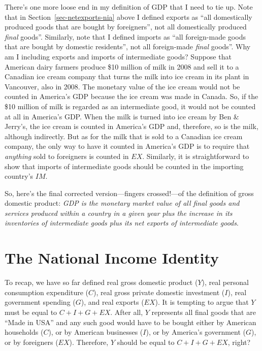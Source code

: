 \documentclass[
  letterpaper,
]{book}
\begin{document}
There's one more loose end in my definition of GDP that I need to tie
up. Note that in Section~\ref{sec-netexports-nia} above I defined
exports as ``all domestically produced goods that are bought by
foreigners'', not all domestically produced \emph{final} goods''.
Similarly, note that I defined imports as ``all foreign-made goods that
are bought by domestic residents'', not all foreign-made \emph{final}
goods''. Why am I including exports and imports of intermediate goods?
Suppose that American dairy farmers produce \$10 million of milk in 2008
and sell it to a Canadian ice cream company that turns the milk into ice
cream in its plant in Vancouver, also in 2008. The monetary value of the
ice cream would not be counted in America's GDP because the ice cream
was made in Canada. So, if the \$10 million of milk is regarded as an
intermediate good, it would not be counted at all in America's GDP. When
the milk is turned into ice cream by Ben \& Jerry's, the ice cream is
counted in America's GDP and, therefore, so is the milk, although
indirectly. But as for the milk that is sold to a Canadian ice cream
company, the only way to have it counted in America's GDP is to require
that \emph{anything} sold to foreigners is counted in \(EX\). Similarly,
it is straightforward to show that imports of intermediate goods should
be counted in the importing country's \(IM\).

So, here's the final corrected version---fingers crossed!---of the
definition of gross domestic product: \emph{GDP is the monetary market
value of all final goods and services produced within a country in a
given year plus the increase in its inventories of intermediate goods
plus its net exports of intermediate goods}.

\section{The National Income Identity}\label{sec-ni-identity}

To recap, we have so far defined real gross domestic product (\(Y\)),
real personal consumption expenditure (\(C\)), real gross private
domestic investment (\(I\)), real government spending (\(G\)), and real
exports (\(EX\)). It is tempting to argue that \(Y\) must be equal to
\(C+I+G+EX\). After all, \(Y\) represents all final goods that are
``Made in USA'' and any such good would have to be bought either by
American households (\(C\)), or by American businesses (\(I\)), or by
America's government (\(G\)), or by foreigners (\(EX\)). Therefore,
\(Y\) should be equal to \(C+I+G+EX\), right?
\end{document}
